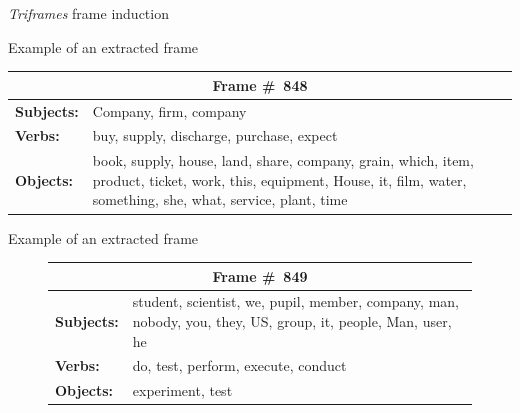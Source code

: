 \begin{frame}{\textit{Triframes} frame induction}

\vspace{-10pt}
\begin{algorithmic}
\pause 
{}
\pause 
{}
\ENDFOR
{}
\end{algorithmic}

	
\end{frame}


\begin{frame}{Example of an extracted frame}

\begin{center}
	

  \begin{tabular}{lp{70mm}}\toprule
  \multicolumn{2}{c}{\textbf{Frame \#~848}} \\\toprule
  \textbf{Subjects:} & Company, firm, company \\\midrule
  \textbf{Verbs:}    & buy, supply, discharge, purchase, expect \\\midrule
  \textbf{Objects:}  & book, supply, house, land, share, company, grain, which, item, product, ticket, work, this, equipment, House, it,     film, water, something, she, what, service, plant, time \\\bottomrule
  \end{tabular}
\end{center}
	
\end{frame}


\begin{frame}{Example of an extracted frame}

\begin{figure}
  \centering
  \begin{tabular}{lp{70mm}}\toprule
  \multicolumn{2}{c}{\textbf{Frame \#~849}} \\\toprule
  \textbf{Subjects:} & student, scientist, we, pupil, member, company, man, nobody, you, they, US, group, it, people, Man, user, he          \\\midrule
    \textbf{Verbs:}    & do, test, perform, execute, conduct \\\midrule

  \textbf{Objects:}  & experiment, test \\\bottomrule
  \end{tabular}
\end{figure}
	
\end{frame}




